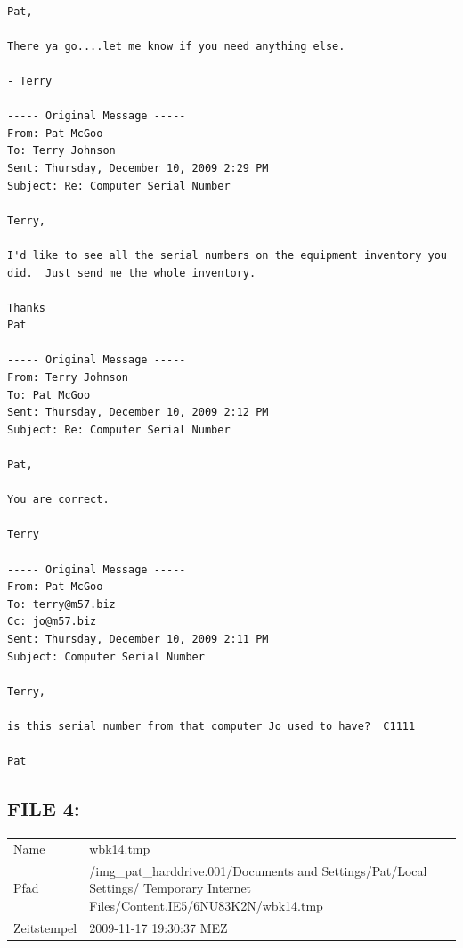 \begin{lstlisting}

Pat,

There ya go....let me know if you need anything else. 

- Terry

----- Original Message -----
From: Pat McGoo
To: Terry Johnson
Sent: Thursday, December 10, 2009 2:29 PM
Subject: Re: Computer Serial Number

Terry,

I'd like to see all the serial numbers on the equipment inventory you
did.  Just send me the whole inventory.

Thanks
Pat

----- Original Message -----
From: Terry Johnson
To: Pat McGoo
Sent: Thursday, December 10, 2009 2:12 PM
Subject: Re: Computer Serial Number

Pat,

You are correct.

Terry

----- Original Message -----
From: Pat McGoo
To: terry@m57.biz
Cc: jo@m57.biz
Sent: Thursday, December 10, 2009 2:11 PM
Subject: Computer Serial Number

Terry,

is this serial number from that computer Jo used to have?  C1111

Pat
\end{lstlisting}
\newpage
\subsection{FILE 4:}
\label{sec:pat_emails_4}

\begin{table}[htb]
	\begin{tabular}{p{2cm} p{13.5cm}}
		Name & wbk14.tmp\\
		Pfad & /img_pat_harddrive.001/Documents and Settings/Pat/Local Settings/ Temporary Internet Files/Content.IE5/6NU83K2N/wbk14.tmp\\
		Zeitstempel & 2009-11-17 19:30:37 MEZ
	\end{tabular}
\end{table}		


